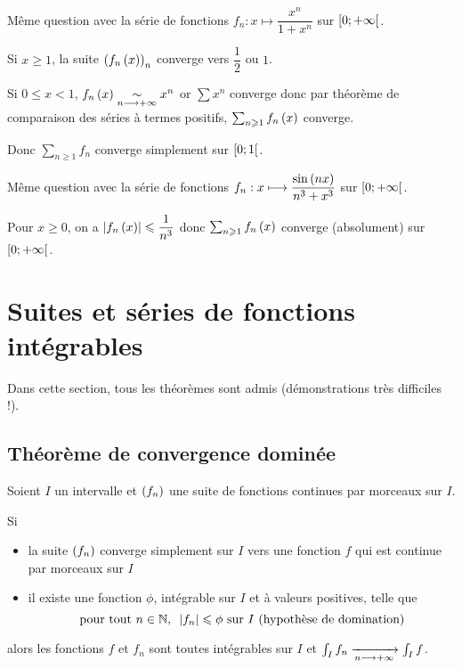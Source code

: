 \begin{exo}
Même question avec la série de fonctions \(f_n:x\mapsto\dfrac{x^n}{1+x^n}\) sur \(\left[0;+\infty\right[\).
\end{exo}

\begin{corr}
Si \(x\geq1\), la suite \(\left(f_n\left(x\right)\right)_n\) converge vers \(\dfrac{1}{2}\) ou \(1\).

Si \(0\leq x<1\), \(f_n\left(x\right)\underset{n\longrightarrow+\infty}{\sim}x^n\) or \(\sum x^n\) converge donc par théorème de comparaison des séries à termes positifs, \(\sum_{n\geqslant1}f_n\left(x\right)\) converge.

Donc \(\sum_{n\geq1}f_n\) converge simplement sur \(\left[0;1\right[\).
\end{corr}

\begin{exo}
Même question avec la série de fonctions \(f_n:x\longmapsto\dfrac{\sin\left(nx\right)}{n^3+x^3}\) sur \(\left[0;+\infty\right[\).
\end{exo}

\begin{corr}
Pour \(x\geq0\), on a \(\left\lvert f_n\left(x\right)\right\rvert\leqslant\dfrac{1}{n^3}\) donc \(\sum_{n\geqslant1}f_n\left(x\right)\) converge (absolument) sur \(\left[0;+\infty\right[\).
\end{corr}

\section{Suites et séries de fonctions intégrables}

Dans cette section, tous les théorèmes sont admis (démonstrations très difficiles !).

\subsection{Théorème de convergence dominée}

\begin{theo}
Soient \(I\) un intervalle et \(\left(f_n\right)\) une suite de fonctions continues par morceaux sur \(I\).

Si

\begin{itemize}
    \item la suite \(\left(f_n\right)\) converge simplement sur \(I\) vers une fonction \(f\) qui est continue par morceaux sur \(I\) \\
    \item il existe une fonction \(\phi\), intégrable sur \(I\) et à valeurs positives, telle que \[\quantifs{\tpt n\in\N}\abs{f_n}\leq\phi\text{ sur \(I\) (hypothèse de domination)}\]
\end{itemize}

alors les fonctions \(f\) et \(f_n\) sont toutes intégrables sur \(I\) et \(\int_If_n\xrightarrow[n\longrightarrow+\infty]{}\int_If\).
\end{theo}

